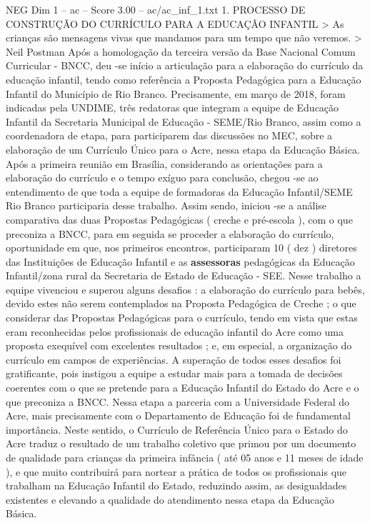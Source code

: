 \begin{textsample}{NEG Dim 1 – ac – Score 3.00 – ac/ac\_inf\_1.txt}  \label{ex:f1_neg_115}
1.
PROCESSO DE CONSTRUÇÃO DO CURRÍCULO PARA A EDUCAÇÃO INFANTIL > As crianças são mensagens vivas que mandamos para um tempo que não veremos. > Neil Postman Após a homologação da terceira versão da Base Nacional Comum Curricular - BNCC, deu -se início a articulação para a elaboração do currículo da educação infantil, tendo como referência a Proposta Pedagógica para a Educação Infantil do Município de Rio Branco.
Precisamente, em março de 2018, foram indicadas pela UNDIME, três redatoras que integram a equipe de Educação Infantil da Secretaria Municipal de Educação - SEME/Rio Branco, assim como a coordenadora de etapa, para participarem das discussões no MEC, sobre a elaboração de um Currículo Único para o Acre, nessa etapa da Educação Básica.
Após a primeira reunião em Brasília, considerando as orientações para a elaboração do currículo e o tempo exíguo para conclusão, chegou -se ao entendimento de que toda a equipe de formadoras da Educação Infantil/SEME Rio Branco participaria desse trabalho.
Assim sendo, iniciou -se a análise comparativa das duas Propostas Pedagógicas ( creche e pré-escola ), com o que preconiza a BNCC, para em seguida se proceder a elaboração do currículo, oportunidade em que, nos primeiros encontros, participaram 10 ( dez ) diretores das Instituições de Educação Infantil e as \textbf{assessoras} pedagógicas da Educação Infantil/zona rural da Secretaria de Estado de Educação - SEE.
Nesse trabalho a equipe vivenciou e superou alguns desafios : a elaboração do currículo para bebês, devido estes não serem contemplados na Proposta Pedagógica de Creche ; o que considerar das Propostas Pedagógicas para o currículo, tendo em vista que estas eram reconhecidas pelos profissionais de educação infantil do Acre como uma proposta exequível com excelentes resultados ; e, em especial, a organização do currículo em campos de experiências.
A superação de todos esses desafios foi gratificante, pois instigou a equipe a estudar mais para a tomada de decisões coerentes com o que se pretende para a Educação Infantil do Estado do Acre e o que preconiza a BNCC.
Nessa etapa a parceria com a Universidade Federal do Acre, mais precisamente com o Departamento de Educação foi de fundamental importância.
Neste sentido, o Currículo de Referência Único para o Estado do Acre traduz o resultado de um trabalho coletivo que primou por um documento de qualidade para crianças da primeira infância ( até 05 anos e 11 meses de idade ), e que muito contribuirá para nortear a prática de todos os profissionais que trabalham na Educação Infantil do Estado, reduzindo assim, as desigualdades existentes e elevando a qualidade do atendimento nessa etapa da Educação Básica.

\end{textsample}
